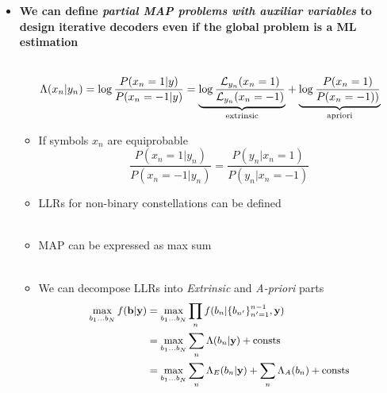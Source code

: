 \documentclass[xcolor=dvipsnames,aspectratio=169]{beamer}
\begin{document}
{\begin{itemize}
        \begin{equation}
            \begin{split}
                \hat{f}^{(i)}(\x|\bb)=&\arg\max_{\bb} f(\hat{\x}^{(i)}|\bb)\\
            \end{split}
        \end{equation}
     \item \textbf{We can define \textit{partial MAP problems with auxiliar variables} to design iterative decoders even if the global problem is a ML estimation}\\ \ \\
         
     \pagebreak   
     \begin{definition}
        $$\Lambda(x_n|y_n)=\log\frac{P(x_n=1|y)}{P(x_n=-1|y)}=\underset{\textnormal{extrinsic}}{\underbrace{\log\frac{\mathcal{L}_{y_n}(x_n=1)}{\mathcal{L}_{y_n}(x_n=-1)}}}+\underset{\textnormal{apriori}}{\underbrace{\log\frac{P(x_n=1)}{P(x_n=-1))}}}$$      \end{definition}
        \begin{itemize}
          \item If symbols $x_n$ are equiprobable
            $$\frac{P(x_n=1|y_n)}{P(x_n=-1|y_n)}=\frac{P(y_n|x_n=1)}{P(y_n|x_n=-1)}$$
          \item LLRs for non-binary constellations can be defined\\ \ \\
     \pagebreak
          \item MAP can be expressed as max sum\\ \ \\
          \item We can decompose LLRs into \textit{Extrinsic} and \textit{A-priori} parts
        \begin{equation*}
        \small
         \begin{split}
          \max_{b_1\dots b_N}f(\mathbf{b}|\mathbf{y})&=\max_{b_1\dots b_N}\prod_{n}f(b_n|\{b_{n'}\}_{n'=1}^{n-1},\mathbf{y})\\
                                     &=\max_{b_1\dots b_N}\sum_{n}\Lambda(b_n|\mathbf{y})+\textnormal{consts}\\
                                     &= \max_{b_1\dots b_N}\sum_{n}\Lambda_{E}(b_n|\mathbf{y})+\sum_{n}\Lambda_{A}(b_n)+\textnormal{consts}
         \end{split}
        \end{equation*}  

\end{itemize}
\end{itemize}}
\end{document}
